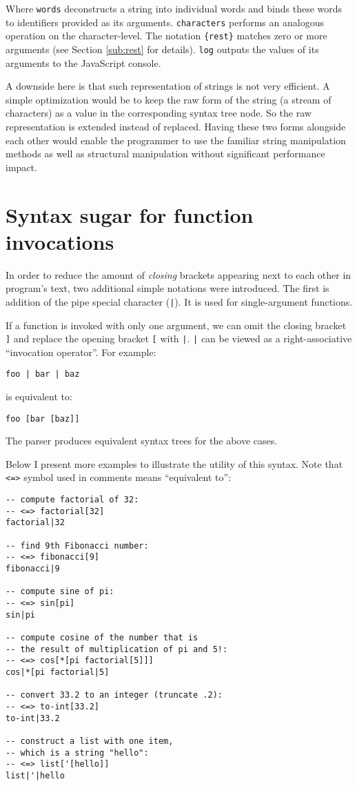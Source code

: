 Where \texttt{words} deconstructs a string into individual words and binds these
words to identifiers provided as its arguments. \texttt{characters} performs
an analogous operation on the character-level. The notation
\texttt{\{rest\}} matches zero or more arguments (see Section \ref{sub:rest} for
details). \texttt{log} outputs the values of its arguments to the JavaScript
console.

A downside here is that such representation of strings is not very efficient. A simple optimization would be to keep the raw form of the string (a stream of characters) as a value in the corresponding syntax tree node. So the raw representation is extended instead of replaced. Having these two forms alongside each other would enable the programmer to use the familiar string
manipulation methods as well as structural manipulation without significant performance impact.

\section{Syntax sugar for function invocations}
In order to reduce the amount of \textit{closing} brackets appearing next to
each other in program's text, two additional simple notations were
introduced. The first is addition of the pipe special character
(\texttt{|}). It is used for single-argument functions.

If a function is invoked with only one argument, we can omit the closing bracket \texttt{]} and replace the opening bracket \texttt{[} with \texttt{|}. \texttt{|} can be viewed as a right-associative ``invocation operator''. For example:
\begin{lstlisting}
foo | bar | baz
\end{lstlisting}
is equivalent to:
\begin{lstlisting}
foo [bar [baz]]
\end{lstlisting}

The parser produces equivalent syntax trees for the above cases.

Below I present more examples to illustrate the utility of this syntax. Note that \texttt{<=>} symbol used in comments means ``equivalent to'':
\begin{lstlisting}
-- compute factorial of 32:
-- <=> factorial[32]
factorial|32

-- find 9th Fibonacci number:
-- <=> fibonacci[9]
fibonacci|9

-- compute sine of pi:
-- <=> sin[pi]
sin|pi

-- compute cosine of the number that is
-- the result of multiplication of pi and 5!:
-- <=> cos[*[pi factorial[5]]]
cos|*[pi factorial|5]

-- convert 33.2 to an integer (truncate .2):
-- <=> to-int[33.2]
to-int|33.2

-- construct a list with one item,
-- which is a string "hello":
-- <=> list['[hello]]
list|'|hello
\end{lstlisting}

